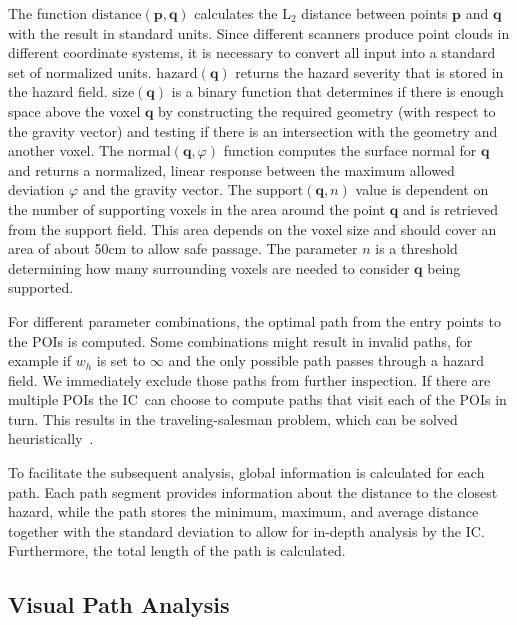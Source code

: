\documentclass[conference,10pt,letter]{IEEEtran}
\def\IC{IC}
\begin{document}
The function $\textrm{distance}(\mathbf{p},\mathbf{q})$ calculates the L$_2$ distance between points $\mathbf{p}$ and $\mathbf{q}$ with the result in standard units. Since different scanners produce point clouds in different coordinate systems, it is necessary to convert all input into a standard set of normalized units. $\textrm{hazard}(\mathbf{q})$ returns the hazard severity that is stored in the hazard field. $\textrm{size}(\mathbf{q})$ is a binary function that determines if there is enough space above the voxel $\mathbf{q}$ by constructing the required geometry (with respect to the gravity vector) and testing if there is an intersection with the geometry and another voxel. The $\textrm{normal}(\mathbf{q},\varphi)$ function computes the surface normal for $\mathbf{q}$ and returns a normalized, linear response between the maximum allowed deviation $\varphi$ and the gravity vector. The $\mathrm{support}(\mathbf{q},n)$ value is dependent on the number of supporting voxels in the area around the point $\mathbf{q}$ and is retrieved from the support field. This area depends on the voxel size and should cover an area of about 50cm to allow safe passage. The parameter $n$ is a threshold determining how many surrounding voxels are needed to consider $\mathbf{q}$ being supported.

For different parameter combinations, the optimal path from the entry points to the POIs is computed. Some combinations might result in invalid paths, for example if $w_h$ is set to $\infty$ and the only possible path passes through a hazard field. We immediately exclude those paths from further inspection. If there are multiple POIs the \IC\ can choose to compute paths that visit each of the POIs in turn. This results in the traveling-salesman problem, which can be solved heuristically~\cite{4569756}.

To facilitate the subsequent analysis, global information is calculated for each path. Each path segment provides information about the distance to the closest hazard, while the path stores the minimum, maximum, and average distance together with the standard deviation to allow for in-depth analysis by the \IC. Furthermore, the total length of the path is calculated. 


\subsection{Visual Path Analysis} \label{sec:overview:pathanalysis}
\end{document}
